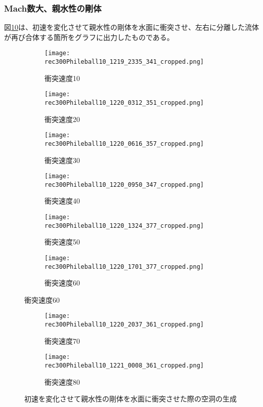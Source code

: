 \documentclass[]{jsarticle}
\begin{document}
\subsubsection{Mach数大、親水性の剛体}
図\ref{fig:hydrophilic}は、初速を変化させて親水性の剛体を水面に衝突させ、左右に分離した流体が再び合体する箇所をグラフに出力したものである。
\begin{figure}[H]
  \centering
\begin{subfigure}{0.3\columnwidth}
  \centering
  \texttt{[image: rec300Phileball10\_1219\_2335\_341\_cropped.png]}
  \caption{衝突速度10}
  \label{fig:philevel10}
\end{subfigure}
\begin{subfigure}{0.3\columnwidth}
  \centering
  \texttt{[image: rec300Phileball10\_1220\_0312\_351\_cropped.png]}
  \caption{衝突速度20}
  \label{fig:philevel20}
\end{subfigure}
\begin{subfigure}{0.3\columnwidth}
  \centering
  \texttt{[image: rec300Phileball10\_1220\_0616\_357\_cropped.png]}
  \caption{衝突速度30}
  \label{fig:philevel30}
\end{subfigure}
\begin{subfigure}{0.3\columnwidth}
  \centering
  \texttt{[image: rec300Phileball10\_1220\_0950\_347\_cropped.png]}
  \caption{衝突速度40}
  \label{fig:philevel40}
\end{subfigure}
\begin{subfigure}{0.3\columnwidth}
  \centering
  \texttt{[image: rec300Phileball10\_1220\_1324\_377\_cropped.png]}
  \caption{衝突速度50}
  \label{fig:philevel50}
\end{subfigure}
\begin{subfigure}{0.3\columnwidth}
  \centering
  \texttt{[image: rec300Phileball10\_1220\_1701\_377\_cropped.png]}
  \caption{衝突速度60}
  \label{fig:philevel60}
\end{subfigure}
\end{figure}
\clearpage
\begin{figure}
\ContinuedFloat
  \begin{subfigure}{0.3\columnwidth}
  \centering
  \texttt{[image: rec300Phileball10\_1220\_2037\_361\_cropped.png]}
  \caption{衝突速度70}
  \label{fig:philevel70}
\end{subfigure}
\begin{subfigure}{0.3\columnwidth}
  \centering
  \texttt{[image: rec300Phileball10\_1221\_0008\_361\_cropped.png]}
  \caption{衝突速度80}
  \label{fig:philevel80}
\end{subfigure}
\caption{初速を変化させて親水性の剛体を水面に衝突させた際の空洞の生成}
\label{fig:hydrophilic}
\end{figure}
\end{document}
